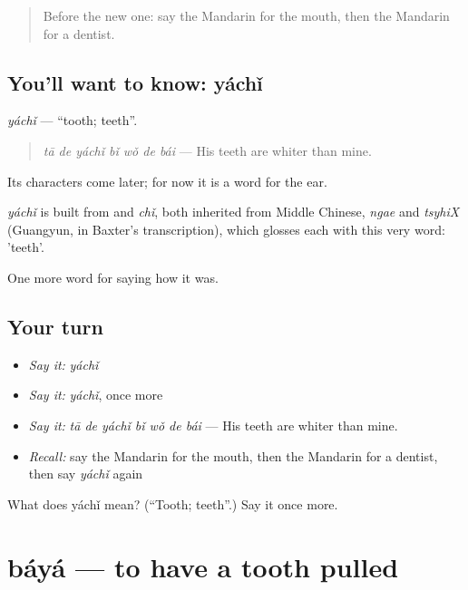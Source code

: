 \begin{quote}
Before the new one: say the Mandarin for the mouth, then the Mandarin for a dentist.
\end{quote}

\subsection*{You'll want to know: yáchǐ}
\emph{yáchǐ} — \textquotedblleft{}tooth; teeth\textquotedblright{}.

\begin{quote}
\emph{tā de yáchǐ bǐ wǒ de bái} — His teeth are whiter than mine.
\end{quote}

Its characters come later; for now it is a word for the ear.

\begin{cousinweb}
\emph{yáchǐ} is built from  and \emph{chǐ}, both inherited from Middle Chinese, \emph{ngae} and \emph{tsyhiX} (Guangyun, in Baxter's transcription), which glosses each with this very word: 'teeth'.
\end{cousinweb}

\begin{grammarlens}[title={What you've built}]
One more word for saying how it was.
\end{grammarlens}

\subsection*{Your turn}
\begin{itemize}
\raggedright
  \item \emph{Say it:} \emph{yáchǐ}
  \item \emph{Say it:} \emph{yáchǐ}, once more
  \item \emph{Say it:} \emph{tā de yáchǐ bǐ wǒ de bái} — His teeth are whiter than mine.
  \item \emph{Recall:} say the Mandarin for the mouth, then the Mandarin for a dentist, then say \emph{yáchǐ} again
\end{itemize}

\begin{tcolorbox}[breakable,colback=teal!4,colframe=teal!35!black,title={Before you move on}]
What does yáchǐ mean? (\textquotedblleft{}Tooth; teeth\textquotedblright{}.) Say it once more.
\end{tcolorbox}
\section[báyá]{báyá — to have a tooth pulled}

